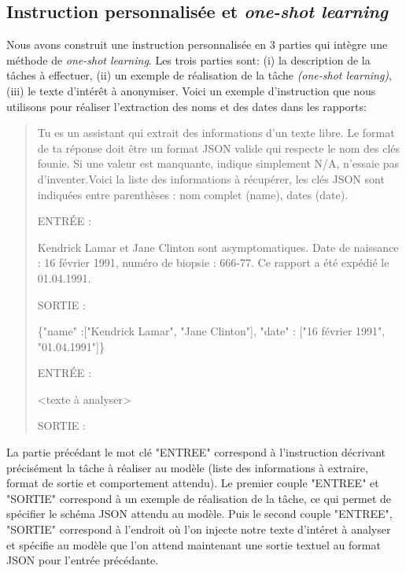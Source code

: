 \subsection{Instruction personnalisée et \textit{one-shot learning}}
Nous avons construit une instruction personnalisée en 3 parties qui intègre une méthode de \textit{one-shot learning}. Les trois parties sont: (i) la description de la tâches à effectuer, (ii) un exemple de réalisation de la tâche \textit{(one-shot learning)}, (iii) le texte d'intérêt à anonymiser.
Voici un exemple d'instruction que nous utilisons pour réaliser l'extraction des noms et des dates dans les rapports:
\begin{quote}
Tu es un assistant qui extrait des informations d'un texte libre. Le format de ta réponse doit être un format JSON valide qui respecte le nom des clés founie. Si une valeur est manquante, indique simplement N/A, n'essaie pas d'inventer.Voici la liste des informations à récupérer, les clés JSON sont indiquées entre parenthèses : nom complet (name), dates (date).

ENTRÉE :

Kendrick Lamar et Jane Clinton sont asymptomatiques. Date de naissance : 16 février 1991, numéro de biopsie : 666-77. Ce rapport a été expédié le 01.04.1991.

SORTIE :

\{"name" :["Kendrick Lamar", "Jane Clinton"], "date" : ["16 février 1991", "01.04.1991"]\}

ENTRÉE :

<texte à analyser>

SORTIE :
\end{quote}
La partie précédant le mot clé "ENTREE" correspond à l'instruction décrivant précisément la tâche à réaliser au modèle (liste des informations à extraire, format de sortie et comportement attendu). Le premier couple "ENTREE" et "SORTIE" correspond à un exemple de réalisation de la tâche, ce qui permet de spécifier le schéma JSON attendu au modèle. Puis le second couple "ENTREE", "SORTIE" correspond à l'endroit où l'on injecte notre texte d'intéret à analyser et spécifie au modèle que l'on attend maintenant une sortie textuel au format JSON pour l'entrée précédante.
